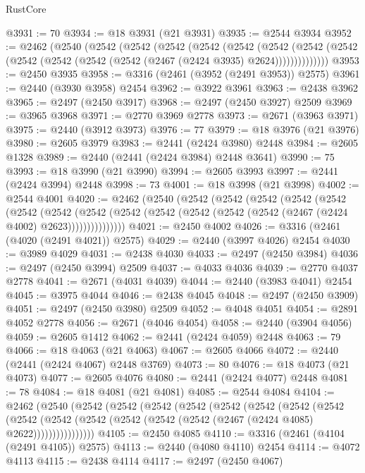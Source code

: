 \begin{lexlean}{RustCore}
\begin{coremodule}
@3931 := 70
@3934 := @18 @3931 (@21 @3931)
@3935 := @2544 @3934
@3952 := @2462
    (@2540
      (@2542
        (@2542
          (@2542
            (@2542
              (@2542
                (@2542
                  (@2542 (@2542 (@2542 (@2542 (@2542 (@2542 (@2467 (@2424 @3935) @2624))))))))))))))
@3953 := @2450 @3935
@3958 := @3316 (@2461 (@3952 (@2491 @3953)) @2575)
@3961 := @2440 (@3930 @3958) @2454
@3962 := @3922 @3961
@3963 := @2438 @3962
@3965 := @2497 (@2450 @3917)
@3968 := @2497 (@2450 @3927) @2509
@3969 := @3965 @3968
@3971 := @2770 @3969 @2778
@3973 := @2671 (@3963 @3971)
@3975 := @2440 (@3912 @3973)
@3976 := 77
@3979 := @18 @3976 (@21 @3976)
@3980 := @2605 @3979
@3983 := @2441 (@2424 @3980) @2448
@3984 := @2605 @1328
@3989 := @2440 (@2441 (@2424 @3984) @2448 @3641)
@3990 := 75
@3993 := @18 @3990 (@21 @3990)
@3994 := @2605 @3993
@3997 := @2441 (@2424 @3994) @2448
@3998 := 73
@4001 := @18 @3998 (@21 @3998)
@4002 := @2544 @4001
@4020 := @2462
    (@2540
      (@2542
        (@2542
          (@2542
            (@2542
              (@2542
                (@2542
                  (@2542
                    (@2542
                      (@2542 (@2542 (@2542 (@2542 (@2542 (@2467 (@2424 @4002) @2623)))))))))))))))
@4021 := @2450 @4002
@4026 := @3316 (@2461 (@4020 (@2491 @4021)) @2575)
@4029 := @2440 (@3997 @4026) @2454
@4030 := @3989 @4029
@4031 := @2438 @4030
@4033 := @2497 (@2450 @3984)
@4036 := @2497 (@2450 @3994) @2509
@4037 := @4033 @4036
@4039 := @2770 @4037 @2778
@4041 := @2671 (@4031 @4039)
@4044 := @2440 (@3983 @4041) @2454
@4045 := @3975 @4044
@4046 := @2438 @4045
@4048 := @2497 (@2450 @3909)
@4051 := @2497 (@2450 @3980) @2509
@4052 := @4048 @4051
@4054 := @2891 @4052 @2778
@4056 := @2671 (@4046 @4054)
@4058 := @2440 (@3904 @4056)
@4059 := @2605 @1412
@4062 := @2441 (@2424 @4059) @2448
@4063 := 79
@4066 := @18 @4063 (@21 @4063)
@4067 := @2605 @4066
@4072 := @2440 (@2441 (@2424 @4067) @2448 @3769)
@4073 := 80
@4076 := @18 @4073 (@21 @4073)
@4077 := @2605 @4076
@4080 := @2441 (@2424 @4077) @2448
@4081 := 78
@4084 := @18 @4081 (@21 @4081)
@4085 := @2544 @4084
@4104 := @2462
    (@2540
      (@2542
        (@2542
          (@2542
            (@2542
              (@2542
                (@2542
                  (@2542
                    (@2542
                      (@2542
                        (@2542
                          (@2542 (@2542 (@2542 (@2542 (@2467 (@2424 @4085) @2622))))))))))))))))
@4105 := @2450 @4085
@4110 := @3316 (@2461 (@4104 (@2491 @4105)) @2575)
@4113 := @2440 (@4080 @4110) @2454
@4114 := @4072 @4113
@4115 := @2438 @4114
@4117 := @2497 (@2450 @4067)

\end{coremodule}
\end{lexlean}

